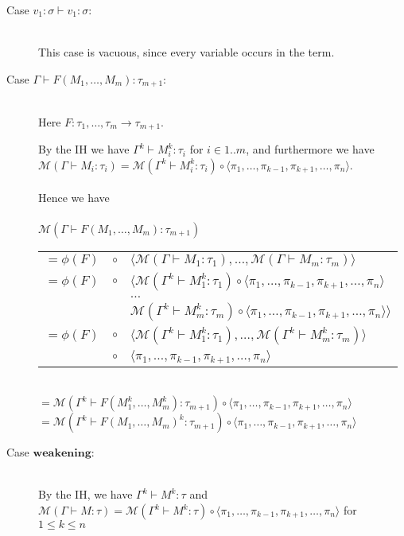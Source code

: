 \documentclass{article}
\newcommand{\mbf}{\mathbf}
\begin{document}
\begin{description}
\item[Case $v_1 : \sigma \vdash v_1 : \sigma$:]~\\
This case is vacuous, since every variable occurs in the term.
\item[Case $\Gamma \vdash F(M_1,\ldots,M_m) : \tau_{m+1}$:]~\\
Here $F : \tau_1, \ldots, \tau_m \to \tau_{m+1}$. 

By the IH we have $\Gamma^k \vdash M_i^k : \tau_i$ for 
$i \in 1..m$, and furthermore we have $\mathcal M(\Gamma \vdash M_i : \tau_i) = \mathcal M(\Gamma^k \vdash M_i^k : \tau_i)
\circ \langle \pi_1, \ldots, \pi_{k-1},\pi_{k+1},\ldots,\pi_n \rangle$.\\~\\
Hence we have\\~\\
$\mathcal M(\Gamma \vdash F(M_1,\ldots,M_m) : \tau_{m+1})$ \\
\begin{tabular}{lll}
$= \phi(F)$ & $\circ$ & $\langle \mathcal M(\Gamma \vdash M_1 : \tau_1), \ldots, \mathcal M(\Gamma \vdash M_m : \tau_m) \rangle$ \\
$= \phi(F)$ & $\circ$ & $\langle \mathcal 
  M(\Gamma^k \vdash M_1^k : \tau_1) \circ \langle \pi_1,\ldots,\pi_{k-1},\pi_{k+1},\ldots,\pi_n\rangle$ \\
 & & $\ldots$ \\
 & & $\mathcal M(\Gamma^k \vdash M_m^k : \tau_m) \circ \langle \pi_1,\ldots,\pi_{k-1},\pi_{k+1},\ldots,\pi_n \rangle \rangle$ \\
$= \phi(F)$ & $\circ$ & $\langle \mathcal M(\Gamma^k \vdash M_1^k : \tau_1), \ldots, \mathcal M(\Gamma^k \vdash M_m^k : \tau_m) \rangle$ \\
 & $\circ$ & $\langle \pi_1, \ldots, \pi_{k-1}, \pi_{k+1}, \ldots, \pi_n \rangle$
\end{tabular}\\
$= \mathcal M(\Gamma^k \vdash F(M_1^k,\ldots, M_m^k) : \tau_{m+1}) \circ \langle \pi_1, \ldots, \pi_{k-1}, \pi_{k+1}, \ldots, \pi_n \rangle$ \\
$= \mathcal M(\Gamma^k \vdash F(M_1,\ldots, M_m)^k : \tau_{m+1}) \circ \langle \pi_1, \ldots, \pi_{k-1}, \pi_{k+1}, \ldots, \pi_n \rangle$

\item[Case $\mbf{weakening}$:]~\\

By the IH, we have $\Gamma^k \vdash M^k : \tau$ and 
$\mathcal M(\Gamma \vdash M : \tau) = \mathcal M(\Gamma^k \vdash M^k : \tau) \circ \langle \pi_1, \ldots, \pi_{k-1},\pi_{k+1},\ldots,\pi_n \rangle$ for $1 \leq k \leq n$


\end{description}
\end{document}
